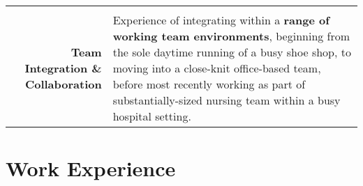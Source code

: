 \documentclass[a4paper, 10pt]{extarticle} %
\begin{document}
\begin{small}
\begin{tabular}{r | p{12cm}}
				\multicolumn{2}{c}{} \\
	

	\begin{minipage}[t]{2.5cm}
		\begin{flushright}
			\textbf{Team Integration \& Collaboration}
		\end{flushright}
	\end{minipage} 
		
		& 
		
		Experience of integrating within a \textbf{range of working team environments}, beginning from the sole daytime running of a busy shoe shop, to moving into a close-knit office-based team, before most recently working as part of substantially-sized nursing team within a busy hospital setting. \\


\end{tabular}
\end{small}



\section{Work Experience}
\end{document}
